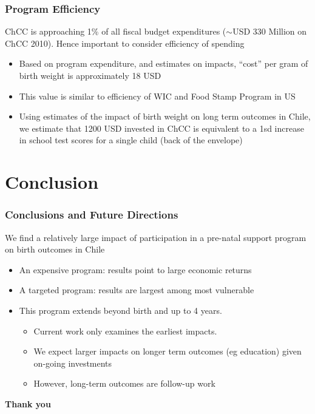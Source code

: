 \documentclass[10pt,letterpaper,subeqn]{beamer}
\begin{document}
\begin{frame}
\frametitle{Program Efficiency}
ChCC is approaching 1\% of all fiscal budget expenditures ($\sim$USD 330 Million on ChCC 2010).  Hence important to consider efficiency of spending \vspace{3mm}
\begin{itemize}
\item Based on program expenditure, and estimates on impacts, ``cost'' per gram of birth weight is approximately 18 USD
\item This value is similar to efficiency of WIC and Food Stamp Program in US
\item Using estimates of the impact of birth weight on long term outcomes in Chile, we estimate
  that 1200 USD invested in ChCC is equivalent to a 1sd increase in school test scores for a single child (back of the envelope)
\end{itemize}
\end{frame}



\section{Conclusion}
\begin{frame}
\frametitle{Conclusions and Future Directions}
We find a relatively large impact of participation in a pre-natal support program on birth outcomes in Chile \\ \vspace{3mm}
\begin{itemize}
\item An expensive program: results point to large economic returns
\item A targeted program: results are largest among most vulnerable
\item This program extends beyond birth and up to 4 years.
\begin{itemize}
  \item Current work only examines the earliest impacts.
  \item We expect larger impacts on longer term outcomes (eg education) given on-going investments
  \item However, long-term outcomes are follow-up work
\end{itemize}
\end{itemize}
\end{frame}

\begin{frame}
\begin{center}
  \textbf{Thank you}
\end{center}
\end{frame}
\end{document}
